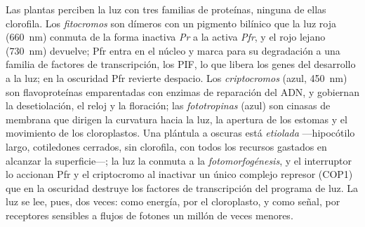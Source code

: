 \begin{definition}[Fotorreceptores]\label{def:b3:plant-molecular-physiology:photoreceptors}
Las plantas perciben la luz con tres familias de proteínas, ninguna de
ellas clorofila. Los \emph{fitocromos} son dímeros con un pigmento
bilínico que la luz roja (\qty{660}{nm}) conmuta de la forma inactiva
\emph{Pr} a la activa \emph{Pfr}, y el rojo lejano (\qty{730}{nm})
devuelve; Pfr entra en el núcleo y marca para su degradación a una
familia de factores de transcripción, los PIF, lo que libera los genes
del desarrollo a la luz; en la oscuridad Pfr revierte despacio. Los
\emph{criptocromos} (azul, \qty{450}{nm}) son flavoproteínas
emparentadas con enzimas de reparación del ADN, y gobiernan la
desetiolación, el reloj y la floración; las \emph{fototropinas} (azul)
son cinasas de membrana que dirigen la curvatura hacia la luz, la
apertura de los estomas y el movimiento de los cloroplastos. Una
plántula a oscuras está \emph{etiolada} ---hipocótilo largo,
cotiledones cerrados, sin clorofila, con todos los recursos gastados en
alcanzar la superficie---; la luz la conmuta a la
\emph{fotomorfogénesis}, y el interruptor lo accionan Pfr y el
criptocromo al inactivar un único complejo represor (COP1) que en la
oscuridad destruye los factores de transcripción del programa de luz.
La luz se lee, pues, dos veces: como energía, por el cloroplasto, y
como señal, por receptores sensibles a flujos de fotones un millón de
veces menores.
\end{definition}

